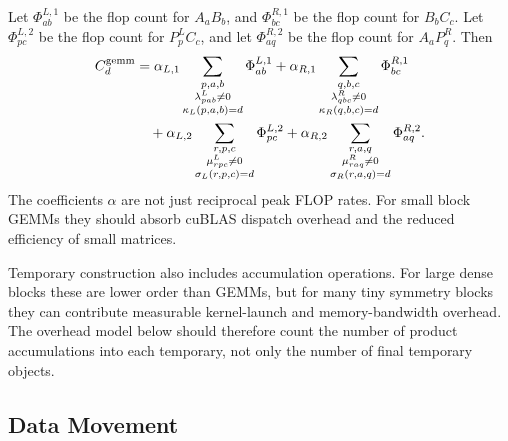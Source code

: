 \documentclass[11pt]{article}
\begin{document}
Let $\Phi^{L,1}_{ab}$ be the flop count for $A_aB_b$, and
$\Phi^{R,1}_{bc}$ be the flop count for $B_bC_c$.  Let
$\Phi^{L,2}_{pc}$ be the flop count for $P^L_pC_c$, and let
$\Phi^{R,2}_{aq}$ be the flop count for $A_aP^R_q$.  Then
\begin{align}
  C^{\mathrm{gemm}}_d &=
    \alpha_{L,1}
      \sum_{\substack{p,a,b\\ \lambda^L_{pab}\ne 0\\ \kappa_L(p,a,b)=d}}
        \Phi^{L,1}_{ab}
  + \alpha_{R,1}
      \sum_{\substack{q,b,c\\ \lambda^R_{qbc}\ne 0\\ \kappa_R(q,b,c)=d}}
        \Phi^{R,1}_{bc} \notag \\
  &\quad
  + \alpha_{L,2}
      \sum_{\substack{r,p,c\\ \mu^L_{rpc}\ne 0\\ \sigma_L(r,p,c)=d}}
        \Phi^{L,2}_{pc}
  + \alpha_{R,2}
      \sum_{\substack{r,a,q\\ \mu^R_{raq}\ne 0\\ \sigma_R(r,a,q)=d}}
        \Phi^{R,2}_{aq}.
\end{align}
The coefficients $\alpha$ are not just reciprocal peak FLOP rates.  For small
block GEMMs they should absorb cuBLAS dispatch overhead and the reduced
efficiency of small matrices.

Temporary construction also includes accumulation operations.  For large dense
blocks these are lower order than GEMMs, but for many tiny symmetry blocks they
can contribute measurable kernel-launch and memory-bandwidth overhead.  The
overhead model below should therefore count the number of product accumulations
into each temporary, not only the number of final temporary objects.

\subsection{Data Movement}
\end{document}
